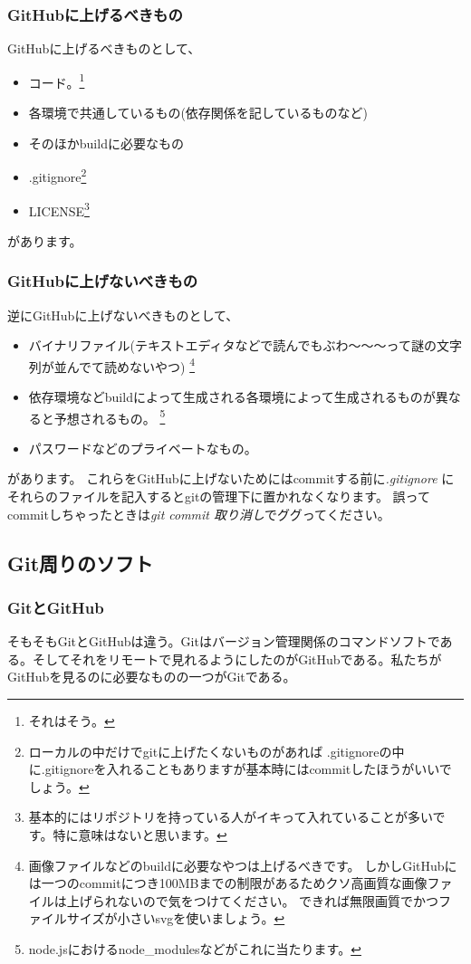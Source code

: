 \documentclass[a4paper]{ltjsreport}
\begin{document}
\subsubsection{GitHubに上げるべきもの}
GitHubに上げるべきものとして、
\begin{itemize}
  \item コード。\footnote{それはそう。}
  \item 各環境で共通しているもの(依存関係を記しているものなど)
  \item そのほかbuildに必要なもの
  \item .gitignore\footnote{ローカルの中だけでgitに上げたくないものがあれば
          .gitignoreの中に.gitignoreを入れることもありますが基本時にはcommitしたほうがいいでしょう。
        }
  \item LICENSE\footnote{基本的にはリポジトリを持っている人がイキって入れていることが多いです。特に意味はないと思います。}
\end{itemize}
があります。
\subsubsection{GitHubに上げないべきもの}
逆にGitHubに上げないべきものとして、
\begin{itemize}
  \item バイナリファイル(テキストエディタなどで読んでもぶわ～～～って謎の文字列が並んでて読めないやつ)
        \footnote{画像ファイルなどのbuildに必要なやつは上げるべきです。
          しかしGitHubには一つのcommitにつき100MBまでの制限があるためクソ高画質な画像ファイルは上げられないので気をつけてください。
          できれば無限画質でかつファイルサイズが小さいsvgを使いましょう。
        }
  \item 依存環境などbuildによって生成される各環境によって生成されるものが異なると予想されるもの。
        \footnote{node.jsにおけるnode\_modulesなどがこれに当たります。}
  \item パスワードなどのプライベートなもの。
\end{itemize}
があります。
これらをGitHubに上げないためにはcommitする前に\emph{.gitignore}
にそれらのファイルを記入するとgitの管理下に置かれなくなります。
誤ってcommitしちゃったときは\emph{git commit 取り消し}でググってください。\subsection{Git周りのソフト}
\subsubsection{GitとGitHub}
そもそもGitとGitHubは違う。Gitはバージョン管理関係のコマンドソフトである。そしてそれをリモートで見れるようにしたのがGitHubである。私たちがGitHubを見るのに必要なものの一つがGitである。
\end{document}
